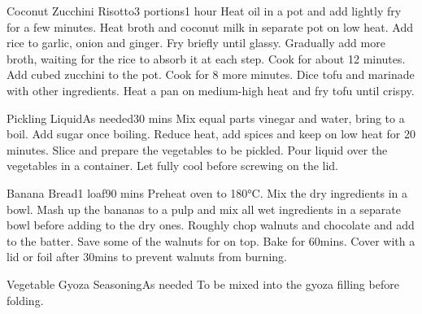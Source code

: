 \documentclass[]{article}
\begin{document}
\begin{center}
\begin{recipe}{Coconut Zucchini Risotto}{3 portions}{1 hour}
	Heat oil in a pot and add lightly fry for a few minutes.
	Heat broth and coconut milk in separate pot on low heat.
	Add rice to garlic, onion and ginger. 
	Fry briefly until glassy.
	\newstep
	Gradually add more broth, waiting for the rice to absorb it at each step.
	Cook for about 12 minutes.
	Add cubed zucchini to the pot. 
	Cook for 8 more minutes.
	Dice tofu and marinade with other ingredients.
	Heat a pan on medium-high heat and fry tofu until crispy.
	\freeform\hrulefill
\end{recipe}

\begin{recipe}{Pickling Liquid}{As needed}{30 mins}
	Mix equal parts vinegar and water, bring to a boil.
	Add sugar once boiling.
	Reduce heat, add spices and keep on low heat for 20 minutes.
	\newstep
	\freeform Slice and prepare the vegetables to be pickled. 
	Pour liquid over the vegetables in a container. 
	Let fully cool before screwing on the lid.
	\freeform\hrulefill
\end{recipe}

\begin{recipe}{Banana Bread}{1 loaf}{90 mins}
	Preheat oven to 180°C. Mix the dry ingredients in a bowl.
	Mash up the bananas to a pulp and mix all wet ingredients in a separate bowl before adding to the dry ones.
	Roughly chop walnuts and chocolate and add to the batter. Save some of the walnuts for on top.
	\newstep
	\freeform Bake for 60mins. Cover with a lid or foil after 30mins to prevent walnuts from burning. 
	\freeform\hrulefill
\end{recipe}

\begin{recipe}{Vegetable Gyoza Seasoning}{As needed}{}
	To be mixed into the gyoza filling before folding. 
	\freeform\hrulefill
\end{recipe}

\end{center}
\end{document}

